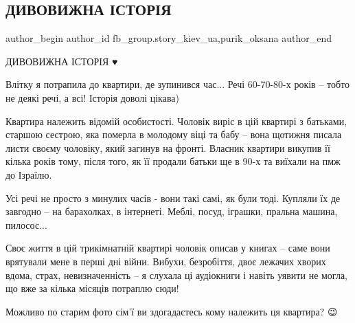  
 
 
 
 

\subsection{ДИВОВИЖНА ІСТОРІЯ}
\label{sec:08_01_2023.fb.fb_group.story_kiev_ua.1.divovizhna__stor_ya}
 
\ifcmt
 author_begin
   author_id fb_group.story_kiev_ua,purik_oksana
 author_end
\fi

ДИВОВИЖНА ІСТОРІЯ ♥️

Влітку я потрапила до квартири, де зупинився час... Речі 60-70-80-х років –
тобто не деякі речі, а всі! Історія доволі цікава)

Квартира належить відомій особистості. Чоловік виріс в цій квартирі з батьками,
старшою сестрою, яка померла в молодому віці та бабу – вона щотижня писала
листи своєму чоловіку, який загинув на фронті. Власник квартири викупив її
кілька років тому, після того, як її продали батьки ще в 90-х та виїхали на пмж
до Ізраїлю.

Усі речі не просто з минулих часів - вони такі самі, як були тоді. Купляли їх
де завгодно – на барахолках, в інтернеті. Меблі, посуд, іграшки, пральна
машина, пилосос... 

Своє життя в цій трикімнатній квартирі чоловік описав у книгах – саме вони
врятували мене в перші дні війни. Вибухи, безробіття, двоє лежачих хворих
вдома, страх, невизначенність – я слухала ці аудіокниги і навіть уявити не
могла, що вже за кілька місяців потраплю сюди!

Можливо по старим фото сім'ї ви здогадаєтесь кому належить ця квартира? 😉
